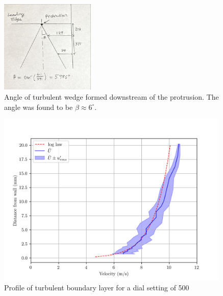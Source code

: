 \documentclass{article}
\begin{document}

\begin{figure}[H]
    \centering
    \includegraphics[width=0.4\textwidth]{turbulent_wedge.jpg}
    \caption{Angle of turbulent wedge formed downstream of the protrusion. The angle was found to be $\beta \approx 6^\circ$.}
    \label{fig:turbulent_wedge}
\end{figure}



\begin{figure}[H]
    \centering
    \includegraphics[width=0.99\textwidth]{turbulent_profile.png}
    \caption{Profile of turbulent boundary layer for a dial setting of 500}
    \label{fig:turbulent_profile}
\end{figure}
\end{document}
